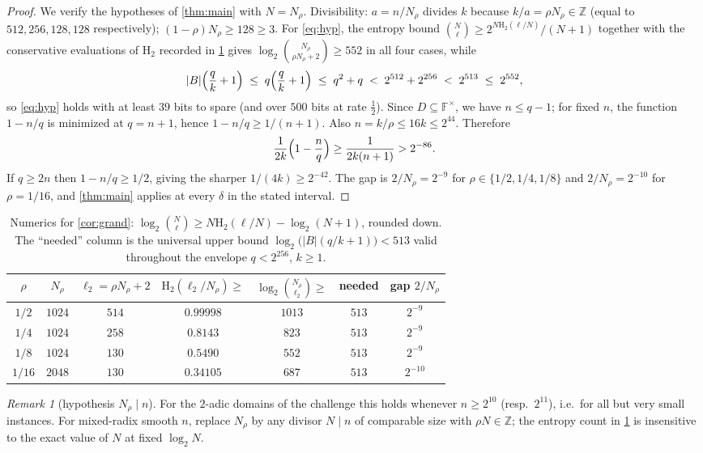 \documentclass[11pt]{article}
\theoremstyle{definition}
\theoremstyle{remark}
\newtheorem{remark}[theorem]{Remark}
\newcommand{\F}{\mathbb{F}}
\newcommand{\B}{B}
\newcommand{\Hb}{\mathrm{H}_2}
\begin{document}
\begin{proof}
We verify the hypotheses of \cref{thm:main} with $N=N_\rho$. Divisibility: $a=n/N_\rho$ divides $k$ because $k/a=\rho N_\rho\in\mathbb Z$ (equal to $512,256,128,128$ respectively); $(1-\rho)N_\rho\ge128\ge3$. For \eqref{eq:hyp}, the entropy bound $\binom N\ell\ge2^{N\Hb(\ell/N)}/(N+1)$ together with the conservative evaluations of $\Hb$ recorded in \cref{tab:numerics} gives $\log_2\binom{N_\rho}{\rho N_\rho+2}\ge552$ in all four cases, while
\[
|\B|\Bigl(\frac qk+1\Bigr)\;\le\;q\Bigl(\frac qk+1\Bigr)\;\le\;q^2+q\;<\;2^{512}+2^{256}\;<\;2^{513}\;\le\;2^{552},
\]
so \eqref{eq:hyp} holds with at least $39$ bits to spare (and over $500$ bits at rate $\frac12$). Since $D\subseteq\F^\times$, we have $n\le q-1$; for fixed $n$, the function $1-n/q$ is minimized at $q=n+1$, hence $1-n/q\ge1/(n+1)$. Also $n=k/\rho\le16k\le2^{44}$. Therefore
\[
\frac1{2k}\Bigl(1-\frac nq\Bigr)\ge\frac1{2k(n+1)}>2^{-86}.
\]
If $q\ge2n$ then $1-n/q\ge1/2$, giving the sharper $1/(4k)\ge2^{-42}$. The gap is $2/N_\rho=2^{-9}$ for $\rho\in\{1/2,1/4,1/8\}$ and $2/N_\rho=2^{-10}$ for $\rho=1/16$, and \cref{thm:main} applies at every $\delta$ in the stated interval.
\end{proof}

\begin{table}[ht]
\centering
\begin{tabular}{ccccccc}
\toprule
$\rho$ & $N_\rho$ & $\ell_2=\rho N_\rho+2$ & $\Hb(\ell_2/N_\rho)\ge$ & $\log_2\binom{N_\rho}{\ell_2}\ge$ & needed & gap $2/N_\rho$\\
\midrule
$1/2$  & $1024$ & $514$ & $0.99998$ & $1013$ & $513$ & $2^{-9}$\\
$1/4$  & $1024$ & $258$ & $0.8143$  & $823$  & $513$ & $2^{-9}$\\
$1/8$  & $1024$ & $130$ & $0.5490$  & $552$  & $513$ & $2^{-9}$\\
$1/16$ & $2048$ & $130$ & $0.34105$ & $687$  & $513$ & $2^{-10}$\\
\bottomrule
\end{tabular}
\caption{Numerics for \cref{cor:grand}: $\log_2\binom{N}{\ell}\ge N\Hb(\ell/N)-\log_2(N+1)$, rounded down. The ``needed'' column is the universal upper bound $\log_2\bigl(|\B|(q/k+1)\bigr)<513$ valid throughout the envelope $q<2^{256}$, $k\ge1$.}
\label{tab:numerics}
\end{table}

\begin{remark}[hypothesis $N_\rho\mid n$]
For the $2$-adic domains of the challenge this holds whenever $n\ge2^{10}$ (resp.\ $2^{11}$), i.e.\ for all but very small instances. For mixed-radix smooth $n$, replace $N_\rho$ by any divisor $N\mid n$ of comparable size with $\rho N\in\mathbb Z$; the entropy count in \cref{tab:numerics} is insensitive to the exact value of $N$ at fixed $\log_2 N$.
\end{remark}
\end{document}
